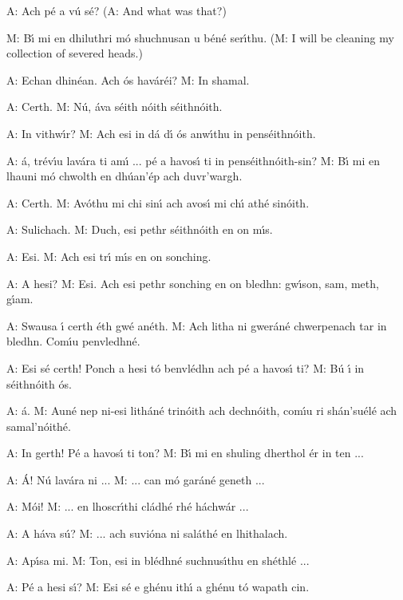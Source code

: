 A: Ach p\'{e} a v\'{u} s\'{e}?
(A: And what was that?)

M: B\'{\i} mi en dhiluthri m\'{o} shuchnusan u b\'{e}n\'{e} ser\'{\i}thu.
(M: I will be cleaning my collection of severed heads.)

A: Echan dhin\'{e}an. Ach \'{o}s hav\'{a}r\'{e}i?
M: In shamal.

A: Certh.
M: N\'{u}, \'{a}va s\'{e}ith n\'{o}ith s\'{e}ithn\'{o}ith.

A: In vithw\'{\i}r?
M: Ach esi in d\'{a} d\'{\i} \'{o}s anw\'{\i}thu in pens\'{e}ithn\'{o}ith.

A: \'{a}, tr\'{e}v\'{\i}u lav\'{a}ra ti am\'{\i} ... p\'{e} a havos\'{\i} ti in pens\'{e}ithn\'{o}ith-sin?
M: B\'{\i} mi en lhauni m\'{o} chwolth en dh\'{u}an'\'{e}p ach duvr'wargh.

A: Certh.
M: Av\'{o}thu mi chi sin\'{\i} ach avos\'{\i} mi ch\'{\i} ath\'{e} sin\'{o}ith.

A: Sulichach.
M: Duch, esi pethr s\'{e}ithn\'{o}ith en on m\'{\i}s.

A: Esi.
M: Ach esi tr\'{\i} m\'{\i}s en on sonching.

A: A hesi?
M: Esi. Ach esi pethr sonching en on bledhn: gw\'{\i}son, sam, meth, g\'{\i}am.

A: Swausa \'{\i} certh \'{e}th gw\'{e} an\'{e}th.
M: Ach litha ni gwer\'{a}n\'{e} chwerpenach tar in bledhn. Com\'{\i}u penvledhn\'{e}.

A: Esi s\'{e} certh! Ponch a hesi t\'{o} benvl\'{e}dhn ach p\'{e} a havos\'{\i} ti?
M: B\'{u} \'{\i} in s\'{e}ithn\'{o}ith \'{o}s.

A: \'{a}.
M: Aun\'{e} nep ni-esi lith\'{a}n\'{e} trin\'{o}ith ach dechn\'{o}ith, com\'{\i}u ri sh\'{a}n’su\'{e}l\'{e} ach samal’n\'{o}ith\'{e}.

A: In gerth! P\'{e} a havos\'{\i} ti ton?
M: B\'{\i} mi en shuling dherthol \'{e}r in ten ...

A: \'{A}! N\'{u} lav\'{a}ra ni ...
M: ... can m\'{o} gar\'{a}n\'{e} geneth ...

A: M\'{o}i!
M: ... en lhoscr\'{\i}thi cl\'{a}dh\'{e} rh\'{e} h\'{a}chw\'{a}r ...

A: A h\'{a}va s\'{u}?
M: ... ach suvi\'{o}na ni sal\'{a}th\'{e} en lhithalach.

A: Ap\'{\i}sa mi.
M: Ton, esi in bl\'{e}dhn\'{e} suchnus\'{\i}thu en sh\'{e}thl\'{e} ... 

A: P\'{e} a hesi s\'{\i}?
M: Esi s\'{e} e gh\'{e}nu ith\'{\i} a gh\'{e}nu t\'{o} wapath cin.


